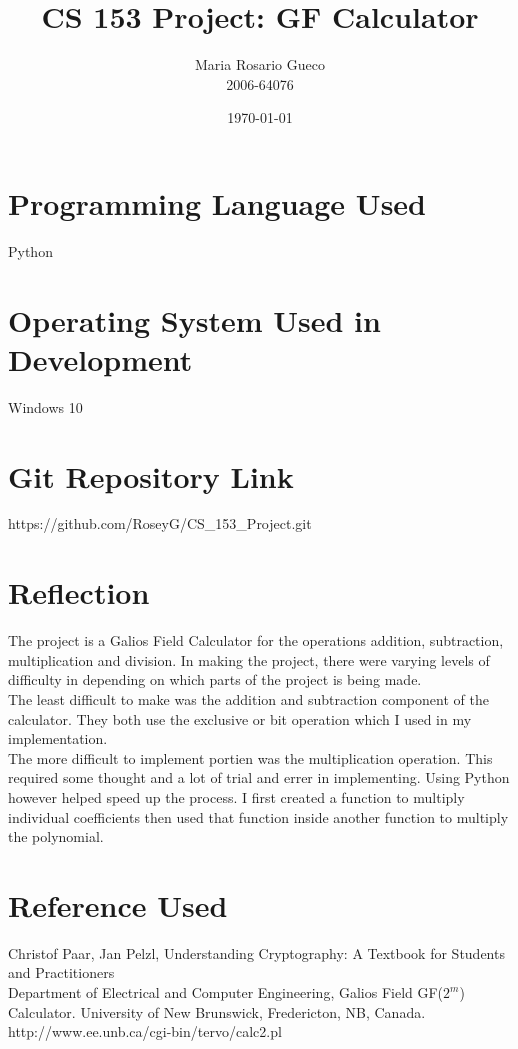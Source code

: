 \documentclass{article}
\title{CS 153 Project: GF Calculator}
\author{Maria Rosario Gueco\\2006-64076}
\date{\today}
\begin{document}
\maketitle

    \section {Programming Language Used}
        Python
    \section {Operating System Used in Development}
        Windows 10
    \section {Git Repository Link}
        https://github.com/RoseyG/CS\_153\_Project.git
    \section {Reflection}

        The project is a Galios Field Calculator for the operations addition, subtraction, multiplication and division. In making the project, there were varying levels of difficulty in depending on which parts of the project is being made.\\

        The least difficult to make was the addition and subtraction component of the calculator. They both use the exclusive or bit operation which I used in my implementation.\\

        The more difficult to implement portien was the multiplication operation. This required some thought and a lot of trial and errer in implementing. Using Python however helped speed up the process. I first created a function to multiply individual coefficients then used that function inside another function to multiply the polynomial.
    \section {Reference Used}
    
    Christof Paar, Jan Pelzl, Understanding Cryptography: A Textbook for Students and Practitioners\\

    Department of Electrical and Computer Engineering, Galios Field GF($2^m$) Calculator. University of New Brunswick, Fredericton, NB, Canada. http://www.ee.unb.ca/cgi-bin/tervo/calc2.pl
\end{document}
